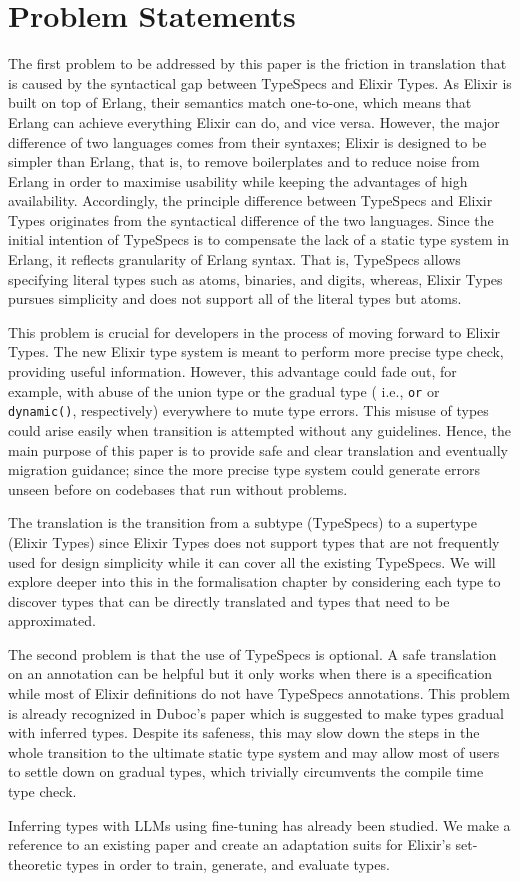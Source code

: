 \section{Problem Statements}

The first problem to be addressed by this paper is the friction in translation that is caused by the syntactical gap between TypeSpecs and Elixir Types.
As Elixir is built on top of Erlang, their semantics match one-to-one, which means that Erlang can achieve everything Elixir can do, and vice versa.
However, the major difference of two languages comes from their syntaxes; Elixir is designed to be simpler than Erlang, that is, to remove boilerplates and to reduce noise from Erlang in order to maximise usability while keeping the advantages of high availability.
Accordingly, the principle difference between TypeSpecs and Elixir Types originates from the syntactical difference of the two languages.
Since the initial intention of TypeSpecs is to compensate the lack of a static type system in Erlang, it reflects granularity of Erlang syntax.
That is, TypeSpecs allows specifying literal types such as atoms, binaries, and digits, whereas, Elixir Types pursues simplicity and does not support all of the literal types but atoms.

This problem is crucial for developers in the process of moving forward to Elixir Types. 
The new Elixir type system is meant to perform more precise type check, providing useful information. 
However, this advantage could fade out, for example, with abuse of the union type or the gradual type ( i.e., \texttt{or} or \texttt{dynamic()}, respectively) everywhere to mute type errors. 
This misuse of types could arise easily when transition is attempted without any guidelines. Hence, the main purpose of this paper is to provide safe and clear translation and eventually migration guidance; since the more precise type system could generate errors unseen before on codebases that run without problems.

The translation is the transition from a subtype (TypeSpecs) to a supertype (Elixir Types) since Elixir Types does not support types that are not frequently used for design simplicity while it can cover all the existing TypeSpecs. 
We will explore deeper into this in the formalisation chapter by considering each type to discover types that can be directly translated and types that need to be approximated.

The second problem is that the use of TypeSpecs is optional.
A safe translation on an annotation can be helpful but it only works when there is a specification while most of Elixir definitions do not have TypeSpecs annotations.
This problem is already recognized in Duboc's paper which is suggested to make types gradual with inferred types.
Despite its safeness, this may slow down the steps in the whole transition to the ultimate static type system and may allow most of users to settle down on gradual types, which trivially circumvents the compile time type check.

Inferring types with LLMs using fine-tuning has already been studied.
We make a reference to an existing paper and create an adaptation suits for Elixir's set-theoretic types in order to train, generate, and evaluate types.